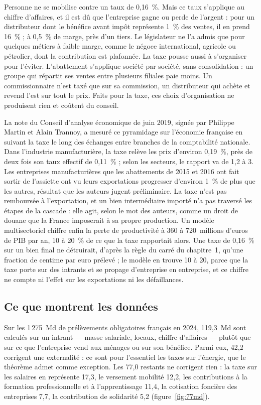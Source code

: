 \documentclass[11pt,a4paper]{article}
\providecommand{\euro}{\texteuro}
\begin{document}
Personne ne se mobilise contre un taux de 0,16~\%. Mais ce taux s'applique au chiffre d'affaires, et
il est dû que l'entreprise gagne ou perde de l'argent : pour un distributeur dont le bénéfice avant
impôt représente 1~\% des ventes, il en prend 16~\% ; à 0,5~\% de marge, près d'un tiers. Le
législateur ne l'a admis que pour quelques métiers à faible marge, comme le négoce international,
agricole ou pétrolier, dont la contribution est plafonnée. La taxe pousse aussi à s'organiser pour
l'éviter. L'abattement s'applique société par société, sans consolidation : un groupe qui répartit
ses ventes entre plusieurs filiales paie moins. Un commissionnaire n'est taxé que sur sa
commission, un distributeur qui achète et revend l'est sur tout le prix. Faits pour la taxe, ces
choix d'organisation ne produisent rien et coûtent du conseil.

La note du Conseil d'analyse économique de juin 2019, signée par Philippe Martin et Alain Trannoy,
a mesuré ce pyramidage sur l'économie française en suivant la taxe le long des échanges entre
branches de la comptabilité nationale. Dans l'industrie manufacturière, la taxe relève les prix
d'environ 0,19~\%, près de deux fois son taux effectif de 0,11~\% ; selon les secteurs, le rapport
va de 1,2 à 3. Les entreprises manufacturières que les abattements de 2015 et 2016 ont fait sortir
de l'assiette ont vu leurs exportations progresser d'environ 1~\% de plus que les autres, résultat
que les auteurs jugent préliminaire. La taxe n'est pas remboursée à l'exportation, et un bien
intermédiaire importé n'a pas traversé les étapes de la cascade : elle agit, selon le mot des
auteurs, comme un droit de douane que la France imposerait à sa propre production. Un modèle
multisectoriel chiffre enfin la perte de productivité à 360 à 720~millions d'euros de PIB par an,
10 à 20~\% de ce que la taxe rapportait alors. Une taxe de 0,16~\% sur un bien final ne
détruirait, d'après la règle du carré du chapitre~1, qu'une fraction de centime par euro prélevé ;
le modèle en trouve 10 à 20, parce que la taxe porte sur des intrants et se propage d'entreprise en
entreprise, et ce chiffre ne compte ni l'effet sur les exportations ni les défaillances.

\subsection{Ce que montrent les données}

Sur les 1\,275~Md\euro{} de prélèvements obligatoires français en 2024, 119,3~Md\euro{} sont
calculés sur un intrant --- masse salariale, locaux, chiffre d'affaires --- plutôt que sur ce que
l'entreprise vend aux ménages ou sur son bénéfice. Parmi eux, 42,2 corrigent une externalité : ce
sont pour l'essentiel les taxes sur l'énergie, que le théorème admet comme exception. Les 77,0
restants ne corrigent rien : la taxe sur les salaires en représente 17,3, le versement mobilité
12,2, les contributions à la formation professionnelle et à l'apprentissage 11,4, la cotisation
foncière des entreprises 7,7, la contribution de solidarité 5,2 (figure~\ref{fig:77md}).
\end{document}
